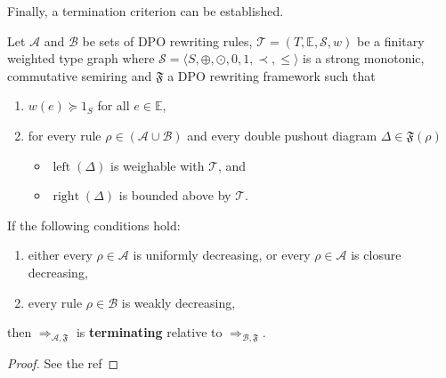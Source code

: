 Finally, a termination criterion can be established.
\begin{theorem} 
    \label{thm:termination_grs}
    Let $\mathcal{A}$ and $\mathcal{B}$ be sets of DPO rewriting rules, $\mathcal{T} = (T,\mathbb{E}, \mathcal{S}, w)$ be a finitary weighted type graph where $\mathcal{S} = \langle S, \oplus, \odot, 0, 1, \prec, \leq \rangle$ is a strong monotonic, commutative semiring and $\mathfrak{F}$ a DPO rewriting framework such that

     \begin{enumerate}
        \item\label{thm1:hyp3} $w(e) \succeq 1_S$ for all $e \in \mathbb{E}$,
        \item for every rule $\rho \in (\mathcal{A }\cup \mathcal{B })$ and every double pushout diagram  
        $\Delta \in \mathfrak{F}(\rho)$ 
        \begin{itemize}
            \item \(\operatorname{left}(\Delta)\) is weighable with \(\mathcal{T}\), and
            \item \(\operatorname{right}(\Delta)\) is bounded above by \(\mathcal{T}\). 
        \end{itemize}
    \end{enumerate}       

    \noindent If the following conditions hold:
    \begin{enumerate}
        \item either every $\rho \in \mathcal{A}$ is uniformly decreasing, or every $\rho \in \mathcal{A}$ is closure decreasing,
        \item every rule $\rho \in \mathcal{B}$ is weakly decreasing,
    \end{enumerate}
    then $\Rightarrow_{\mathcal{A},\mathfrak{F}}$ is \textbf{terminating} relative to $\Rightarrow_{\mathcal{B},\mathfrak{F}}$.
\end{theorem} 
\begin{proof}
    See the 
    ref
\end{proof}